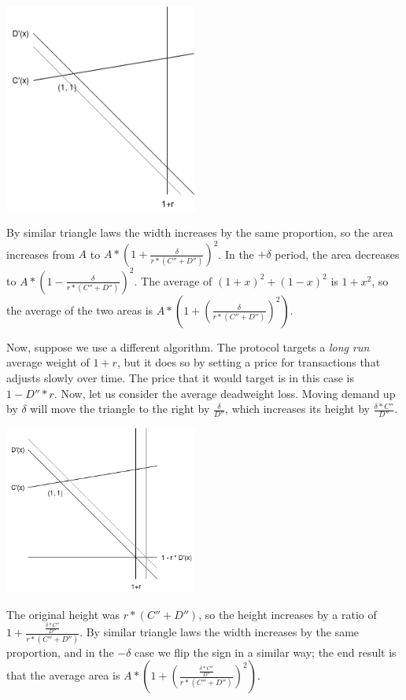 \documentclass[12pt, final]{article}
\begin{document}
\begin{center}
\includegraphics[width=2.5in]{Triangle2.png} \\
\end{center}

By similar triangle laws the width increases by the same proportion, so the area increases from $A$ to $A * (1 + \frac{\delta}{r * (C'' + D'')})^2$. In the $+\delta$ period, the area decreases to $A * (1 - \frac{\delta}{r * (C'' + D'')})^2$. The average of $(1+x)^2 + (1-x)^2$ is $1 + x^2$, so the average of the two areas is $A * (1 + (\frac{\delta}{r * (C'' + D'')})^2)$.

Now, suppose we use a different algorithm. The protocol targets a \emph{long run} average weight of $1 + r$, but it does so by setting a price for transactions that adjusts slowly over time. The price that it would target is in this case is $1 - D'' * r$. Now, let us consider the average deadweight loss. Moving demand up by $\delta$ will move the triangle to the right by $\frac{\delta}{D''}$, which increases its height by $\frac{\delta * C''}{D''}$.

\begin{center}
\includegraphics[width=2.5in]{Triangle3.png} \\
\end{center}

The original height was $r * (C'' + D'')$, so the height increases by a ratio of $1 + \frac{\frac{\delta * C''}{D''}}{r * (C'' + D'')}$. By similar triangle laws the width increases by the same proportion, and in the $-\delta$ case we flip the sign in a similar way; the end result is that the average area is $A * (1 + (\frac{\frac{\delta * C''}{D''}}{r * (C'' + D'')})^2)$.
\end{document}
